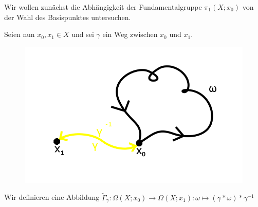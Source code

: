 \documentclass[a4paper,10pt]{scrartcl}
\begin{document}
Wir wollen zunächst die Abhängigkeit der Fundamentalgruppe $\pi_1(X;x_0)$ von der Wahl des Basispunktes untersuchen.\\
\begin{figure}[ht]
\centering
{} 
\end{figure}

Seien nun $x_0,x_1 \in X$ und sei $\gamma$ ein Weg zwischen $x_0$ und $x_1$.
\begin{figure}[ht]
\centering
\includegraphics[scale=0.3]{fig66.png}
\end{figure}
Wir definieren eine Abbildung $\tilde \Gamma_\gamma: \Omega(X;x_0)\to \Omega(X;x_1): \omega\mapsto (\gamma*\omega)*\gamma^{-1}$
\end{document}
